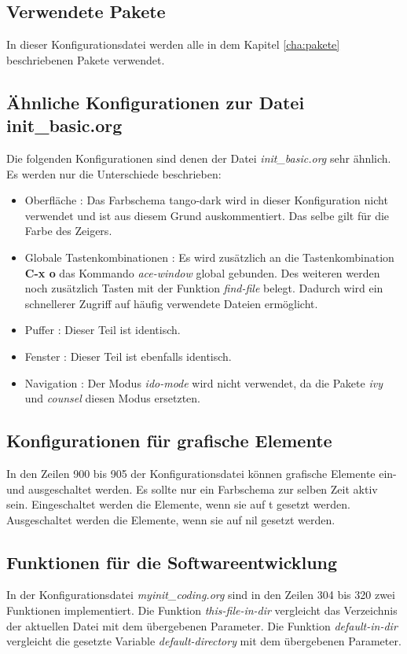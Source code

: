 \subsection{Verwendete Pakete}
\label{subsec:codingverwpak}
In dieser Konfigurationsdatei werden alle in dem Kapitel
\ref{cha:pakete} beschriebenen Pakete verwendet.\\

\subsection{Ähnliche Konfigurationen zur Datei init\_basic.org}
Die folgenden Konfigurationen sind denen der Datei
\textit{init\_basic.org} sehr ähnlich. Es werden nur die Unterschiede
beschrieben:
\begin{itemize}
\item Oberfläche : Das Farbschema {\glqq}tango-dark{\grqq} wird in
  dieser Konfiguration nicht verwendet und ist aus diesem Grund
  auskommentiert. Das selbe gilt für die Farbe des Zeigers.
\item Globale Tastenkombinationen : Es wird zusätzlich an die
  Tastenkombination \textbf{C-x o} das Kommando \textit{ace-window}
  global gebunden. Des weiteren werden noch zusätzlich Tasten mit der
  Funktion \textit{find-file} belegt. Dadurch wird ein schnellerer
  Zugriff auf häufig verwendete Dateien ermöglicht.
\item Puffer : Dieser Teil ist identisch.
\item Fenster : Dieser Teil ist ebenfalls identisch.
\item Navigation : Der Modus \textit{ido-mode} wird nicht verwendet,
  da die Pakete \textit{ivy} und \textit{counsel} diesen Modus
  ersetzten.
\end{itemize}

\subsection{Konfigurationen für grafische Elemente}
\label{subsec:guikonf}
In den Zeilen 900 bis 905 der Konfigurationsdatei können grafische
Elemente ein- und ausgeschaltet werden. Es sollte nur ein Farbschema
zur selben Zeit aktiv sein. Eingeschaltet werden die Elemente, wenn
sie auf {\glqq}t{\grqq} gesetzt werden. Ausgeschaltet werden die
Elemente, wenn sie auf {\glqq}nil{\grqq} gesetzt werden.\\

\subsection{Funktionen für die Softwareentwicklung}
\label{subsec:funkswkonf}
In der Konfigurationsdatei \textit{myinit\_coding.org} sind in den
Zeilen 304 bis 320 zwei Funktionen implementiert. Die Funktion
\textit{this-file-in-dir} vergleicht das Verzeichnis der aktuellen
Datei mit dem übergebenen Parameter. Die Funktion
\textit{default-in-dir} vergleicht die gesetzte Variable
\textit{default-directory} mit dem übergebenen Parameter.


